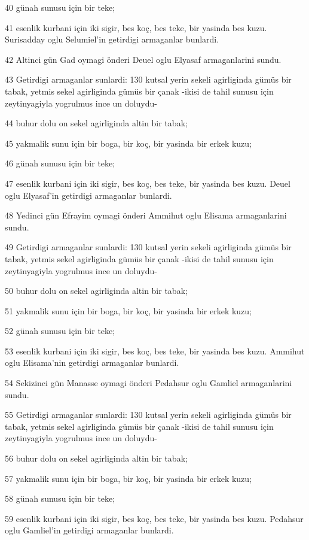 \par 40 günah sunusu için bir teke;
\par 41 esenlik kurbani için iki sigir, bes koç, bes teke, bir yasinda bes kuzu. Surisadday oglu Selumiel'in getirdigi armaganlar bunlardi.
\par 42 Altinci gün Gad oymagi önderi Deuel oglu Elyasaf armaganlarini sundu.
\par 43 Getirdigi armaganlar sunlardi: 130 kutsal yerin sekeli agirliginda gümüs bir tabak, yetmis sekel agirliginda gümüs bir çanak -ikisi de tahil sunusu için zeytinyagiyla yogrulmus ince un doluydu-
\par 44 buhur dolu on sekel agirliginda altin bir tabak;
\par 45 yakmalik sunu için bir boga, bir koç, bir yasinda bir erkek kuzu;
\par 46 günah sunusu için bir teke;
\par 47 esenlik kurbani için iki sigir, bes koç, bes teke, bir yasinda bes kuzu. Deuel oglu Elyasaf'in getirdigi armaganlar bunlardi.
\par 48 Yedinci gün Efrayim oymagi önderi Ammihut oglu Elisama armaganlarini sundu.
\par 49 Getirdigi armaganlar sunlardi: 130 kutsal yerin sekeli agirliginda gümüs bir tabak, yetmis sekel agirliginda gümüs bir çanak -ikisi de tahil sunusu için zeytinyagiyla yogrulmus ince un doluydu-
\par 50 buhur dolu on sekel agirliginda altin bir tabak;
\par 51 yakmalik sunu için bir boga, bir koç, bir yasinda bir erkek kuzu;
\par 52 günah sunusu için bir teke;
\par 53 esenlik kurbani için iki sigir, bes koç, bes teke, bir yasinda bes kuzu. Ammihut oglu Elisama'nin getirdigi armaganlar bunlardi.
\par 54 Sekizinci gün Manasse oymagi önderi Pedahsur oglu Gamliel armaganlarini sundu.
\par 55 Getirdigi armaganlar sunlardi: 130 kutsal yerin sekeli agirliginda gümüs bir tabak, yetmis sekel agirliginda gümüs bir çanak -ikisi de tahil sunusu için zeytinyagiyla yogrulmus ince un doluydu-
\par 56 buhur dolu on sekel agirliginda altin bir tabak;
\par 57 yakmalik sunu için bir boga, bir koç, bir yasinda bir erkek kuzu;
\par 58 günah sunusu için bir teke;
\par 59 esenlik kurbani için iki sigir, bes koç, bes teke, bir yasinda bes kuzu. Pedahsur oglu Gamliel'in getirdigi armaganlar bunlardi.
